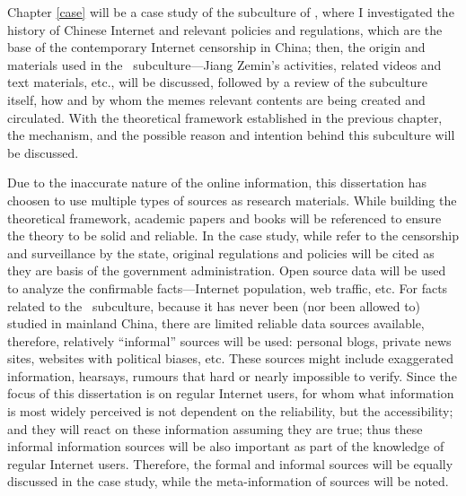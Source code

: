 Chapter \ref{case} will be a case study of the subculture of \moha, where I investigated the history of Chinese Internet and relevant policies and regulations, which are the base of the contemporary Internet censorship in China; then, the origin and materials used in the \moha\ subculture---Jiang Zemin's activities, related videos and text materials, etc., will be discussed, followed by a review of the subculture itself, how and by whom the memes relevant contents are being created and circulated. With the theoretical framework established in the previous chapter, the mechanism, and the possible reason and intention behind this subculture will be discussed.

Due to the inaccurate nature of the online information, this dissertation has choosen to use multiple types of sources as research materials. While building the theoretical framework, academic papers and books will be referenced to ensure the theory to be solid and reliable. In the case study, while refer to the censorship and surveillance by the state, original regulations and policies will be cited as they are basis of the government administration. Open source data will be used to analyze the confirmable facts---Internet population, web traffic, etc. For facts related to the \moha\ subculture, because it has never been (nor been allowed to) studied in mainland China, there are limited reliable data sources available, therefore, relatively ``informal'' sources will be used: personal blogs, private news sites, websites with political biases, etc. These sources might include exaggerated information, hearsays, rumours that hard or nearly impossible to verify. Since the focus of this dissertation is on regular Internet users, for whom what information is most widely perceived is not dependent on the reliability, but the accessibility; and they will react on these information assuming they are true; thus these informal information sources will be also important as part of the knowledge of regular Internet users. Therefore, the formal and informal sources will be equally discussed in the case study, while the meta-information of sources will be noted.
